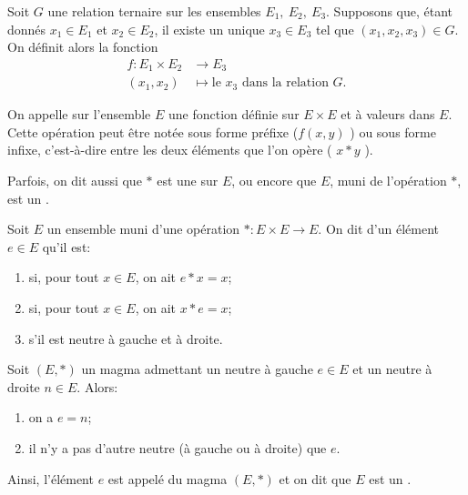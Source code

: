 \begin{normaltext}	\label{NORMooFonctionDeuxVariables}
	Soit \( G \) une relation ternaire sur les ensembles  \( E_1,\ E_2, \ E_3 \). Supposons que, étant donnés \(x_1 \in E_1 \) et \(x_2 \in E_2 \), il existe un unique \(x_3 \in E_3 \) tel que \( (x_1, x_2, x_3) \in G \). On définit alors la fonction
	\begin{equation}
		\begin{aligned}
			f\colon E_1 \times E_2 & \to E_3                                          \\
			(x_1, x_2)             & \mapsto \text{le }x_3\text{ dans la relation }G.
		\end{aligned}
	\end{equation}
\end{normaltext}

\begin{definition}  \label{DEFooOperation}
	On appelle  sur l'ensemble \( E \) une fonction définie sur \( E \times E \) et à valeurs dans  \( E \). Cette opération peut être notée sous forme préfixe (\( f(x, y) \) ) ou sous forme infixe, c'est-à-dire entre les deux éléments que l'on opère ( \( x * y \) ).

	Parfois, on dit aussi que \( * \) est une  sur \( E \), ou encore que \( E \), muni de l'opération \( * \), est un .
\end{definition}

\begin{definition}	\label{DEFooMagmaNeutre}
	Soit \( E \) un ensemble muni d'une opération \( *\colon E\times E\to E\). On dit d'un élément \( e \in E \) qu'il est:
	\begin{enumerate}
		\item
		       si, pour tout \( x \in E \), on ait \( e*x = x \);
		\item
		       si, pour tout \( x \in E \), on ait \( x*e = x \);
		\item
		       s'il est neutre à gauche et à droite.
	\end{enumerate}
\end{definition}

\begin{propositionDef}		\label{PROPooDEFMagmaUnifere}
	Soit \( (E, *) \) un magma admettant un neutre à gauche \( e \in E \) et un neutre à droite \( n \in E \). Alors:
	\begin{enumerate}
		\item
		      on a \( e = n \);
		\item
		      il n'y a pas d'autre neutre (à gauche ou à droite) que \( e \).
	\end{enumerate}
	Ainsi, l'élément \( e \) est appelé  du magma \( (E, *) \) et on dit que  \( E \) est un .
\end{propositionDef}

